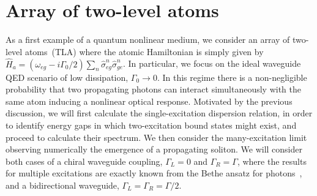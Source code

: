 \documentclass[pra,twocolumn,showpacs,preprintnumbers,amsmath,amssymb]{revtex4-1}
\begin{document}




 

 
 
\section{Array of two-level atoms}\label{Sec.TLAarray}
As a first example of a quantum nonlinear medium, we consider an array of two-level atoms~(TLA) where the atomic Hamiltonian is simply given by $\hat H_a=(\omega_{eg}-i\Gamma_0/2)\sum_n\hat\sigma_{eg}^n\hat\sigma_{ge}^n$. In particular, we focus on the ideal waveguide QED scenario of low dissipation, $\Gamma_0\rightarrow 0$. In this regime there is a non-negligible probability that two propagating photons can interact simultaneously with the same atom  inducing a nonlinear optical response. Motivated by the previous discussion, we will first calculate the single-excitation dispersion relation, in order to identify energy gaps in which two-excitation bound states might exist, and  proceed to calculate their spectrum. We then consider the many-excitation limit observing numerically the emergence of a propagating soliton.  We will consider both cases of a chiral waveguide coupling, $\Gamma_L=0$ and $\Gamma_R=\Gamma$, where the results for multiple excitations are exactly known from the Bethe ansatz for photons~\cite{mahmo_calajo}, and a bidirectional waveguide, $\Gamma_L=\Gamma_R=\Gamma/2$.
\end{document}
